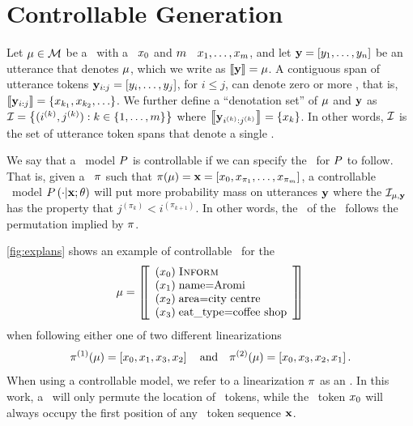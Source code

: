 

\section{Controllable Generation}


Let $\mu \in \mathcal{M}$ be a \meaningrepresentation~with a \dialogueact~$x_0$
and $m$ \attributevalues~$x_1,\ldots,x_{m}$, and let
$\mathbf{y} = \left[y_1,\ldots,y_n\right]$ be 
an utterance that denotes $\mu$, which we write as $\left\llbracket \mathbf{y} \right\rrbracket = \mu$.
A contiguous span of utterance tokens $\mathbf{y}_{i:j} = \left[y_i,\ldots,y_j\right]$, for $i \le j$, 
can denote zero or more \attributevalues, that is,
$\left\llbracket \mathbf{y}_{i:j} \right\rrbracket = \{x_{k_1}, x_{k_2}, \ldots\}$. We further define a ``denotation
set'' of $\mu$ and $\mathbf{y}$ as $\mathcal{I} = \left\{(i^{(k)},j^{(k)}): k \in \left\{1,\ldots,m\right\} \right\}$ where 
$\left\llbracket \mathbf{y}_{i^{(k)}:j^{(k)}} \right\rrbracket = \{ x_k \}$. In other words,
$\mathcal{I}$ is the set of utterance token spans that denote a single
\attributevalue.

We say that a \surfacerealization~model $P$ is controllable if 
we can specify the \surfacerealizationorder~for $P$ to follow. That is,
given a \linearizationstrategy~$\pi$ such that $\pi(\mu) = \mathbf{x} = \left[x_0, x_{\pi_1}, \ldots, x_{\pi_{m}}\right]$, a controllable
\surfacerealization~model $P\left(\cdot|\mathbf{x};\theta\right)$
will put more probability mass on utterances $\mathbf{y}$ where the 
$\mathcal{I}_{\mu,\mathbf{y}}$ has the property that $j^{(\pi_k)} < i^{(\pi_{k+1})}$. In other words, the \surfacerealizationorder~of the \attributevalues~follows the permutation implied by $\pi$.

\autoref{fig:explans} shows an example of controllable \surfacerealization~for the \meaningrepresentation
 \begingroup
 \renewcommand*\arraystretch{.6}
\begin{align} \mu =  \left[\!\!\left[ \begin{array}{l} (x_0)\; \textsc{Inform} \\ (x_1)\; \textrm{name=Aromi} \\ (x_2)\; \textrm{area=city centre} \\ (x_3)\; \textrm{eat\_type=coffee shop} \end{array} \right]\!\!\right]\label{eqn:mr1}\end{align}
\endgroup
when following either one of two different linearizations \[\pi^{(1)}(\mu) = \left[ x_0, x_1, x_3, x_2 \right]\quad \textrm{and} \quad \pi^{(2)}(\mu) = \left[ x_0, x_3, x_2, x_1 \right].\] When using a controllable model, 
we refer to a linearization $\pi$ as an \utteranceplan. In this work, 
a \linearizationstrategy~will only permute the location of \attributevalue~tokens, while the \dialogueact~token $x_0$ will always occupy the first
position of any \meaningrepresentation~token sequence $\mathbf{x}$. 



